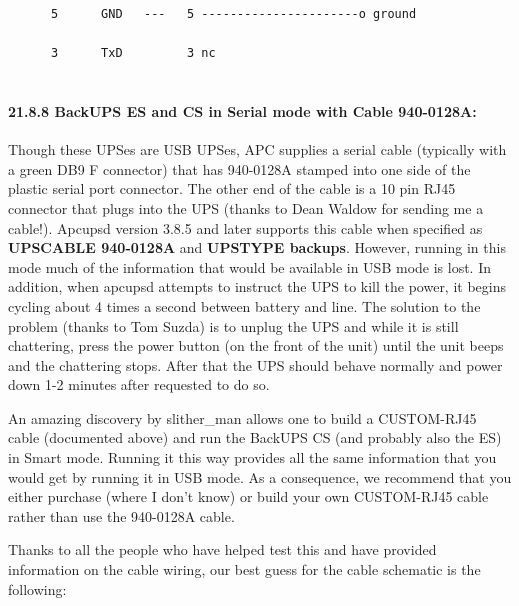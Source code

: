 {{{{{{{{{{\begin{verbatim}
      5      GND   ---   5 ----------------------o ground
     
      3      TxD         3 nc
     
\end{verbatim}
\normalsize

\label{BackUPS-ES-and-CS-in-Serial-mode-with-Cable-940_002d0128A}

\paragraph*{21.8.8 BackUPS ES and CS in Serial mode with Cable 940-0128A:}

\label{index-BackUPS-ES-211}
\label{index-Cables-212}
Though these UPSes are USB UPSes, APC supplies a serial cable (typically with
a green DB9 F connector) that has 940-0128A stamped into one side of the
plastic serial port connector. The other end of the cable is a 10 pin RJ45
connector that plugs into the UPS (thanks to Dean Waldow for sending me a
cable!). Apcupsd version 3.8.5 and later supports this cable when specified as
{\bf UPSCABLE 940-0128A} and {\bf UPSTYPE backups}. However, running in this
mode much of the information that would be available in USB mode is lost. In
addition, when apcupsd attempts to instruct the UPS to kill the power, it
begins cycling about 4 times a second between battery and line. The solution
to the problem (thanks to Tom Suzda) is to unplug the UPS and while it is
still chattering, press the power button (on the front of the unit) until the
unit beeps and the chattering stops. After that the UPS should behave normally
and power down 1-2 minutes after requested to do so.  

An amazing discovery by slither\_man allows one to build a CUSTOM-RJ45 cable
(documented above) and run the BackUPS CS (and probably also the ES) in Smart
mode. Running it this way provides all the same information that you would get
by running it in USB mode. As a consequence, we recommend that you either
purchase (where I don't know) or build your own CUSTOM-RJ45 cable rather than
use the 940-0128A cable.  

Thanks to all the people who have helped test this and have provided
information on the cable wiring, our best guess for the cable schematic is the
following: 

\footnotesize
\begin{verbatim}
     

\end{verbatim}}}}}}}}}}}
